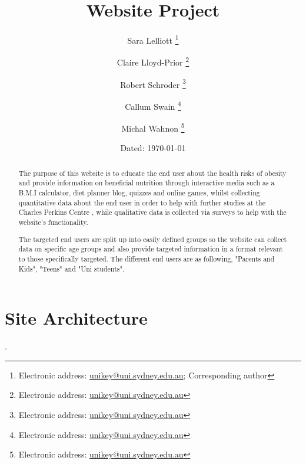 \documentclass[letterpaper,12pt]{article}
\begin{document}

\author{Sara Lelliott%
  \thanks{Electronic address: \href{mailto:slel0001@uni.sydney.edu.au}{unikey@uni.sydney.edu.au}; Corresponding author}}
\author{Claire Lloyd-Prior%
  \thanks{Electronic address: \href{mailto:unikey@uni.sydney.edu.au}{unikey@uni.sydney.edu.au}}}
\author{Robert Schroder%
  \thanks{Electronic address: \href{mailto:unikey@uni.sydney.edu.au}{unikey@uni.sydney.edu.au}}}
\author{Callum Swain%
  \thanks{Electronic address: \href{mailto:unikey@uni.sydney.edu.au}{unikey@uni.sydney.edu.au}}}
\author{Michal Wahnon%
  \thanks{Electronic address: \href{mailto:unikey@uni.sydney.edu.au}{unikey@uni.sydney.edu.au}}}
\title{Website Project}
\date{Dated: \today}

\maketitle
\begin{abstract}
  The purpose of this website is to educate the end user about the health risks of obesity and provide information on beneficial nutrition through interactive media such as a B.M.I calculator, diet planner blog, quizzes and online games, whilst collecting quantitative data about the end user in order to help with further studies at the Charles Perkins Centre , while qualitative data is collected via surveys to help with the website's functionality.

The targeted end users are split up into easily defined groups so the website can collect data on specific age groups and also provide targeted information in a format relevant to those specifically targeted. The different end users are as following, "Parents and Kids", "Teens" and "Uni students".
\end{abstract}
\newpage
\listoffigures
\newpage
\tableofcontents

\section{Site Architecture}

.

\end{document}
